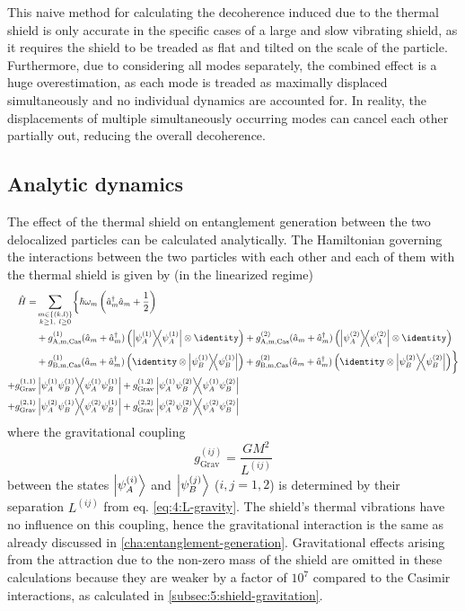 This naive method for calculating the decoherence induced due to the thermal shield is only accurate in the specific cases of a large and slow vibrating shield, as it requires the shield to be treaded as flat and tilted on the scale of the particle.
Furthermore, due to considering all modes separately, the combined effect is a huge overestimation, as each mode is treaded as maximally displaced simultaneously and no individual dynamics are accounted for.
In reality, the displacements of multiple simultaneously occurring modes can cancel each other partially out, reducing the overall decoherence.


\subsection{Analytic dynamics}\label{subsec:5:entanglement-analytical}
The effect of the thermal shield on entanglement generation between the two delocalized particles can be calculated analytically.
The Hamiltonian governing the interactions between the two particles with each other and each of them with the thermal shield is given by (in the linearized regime)
\begin{align}\label{eq:5:hamiltonian}
  \begin{split}
    \op{H} = &\sum_{\substack{m\in\{(k,l)\}\\ k \geq 1,\ l \geq 0}} \biggl\{ \hbar \omega_m \left(\op{a}^\dagger_m \op{a}_m + \frac{1}{2}\right) \\
    &+ g^{(1)}_\mathrm{A,m,Cas}(\op{a}_m + \op{a}^\dagger_m) \left( \ketbra{\psi^{(1)}_A} \otimes \identity \right)
     + g^{(2)}_\mathrm{A,m,Cas}(\op{a}_m + \op{a}^\dagger_m) \left( \ketbra{\psi^{(2)}_A} \otimes \identity \right) \\
    &+ g^{(1)}_\mathrm{B,m,Cas}(\op{a}_m + \op{a}^\dagger_m) \left( \identity \otimes \ketbra{\psi^{(1)}_B} \right)
     + g^{(2)}_\mathrm{B,m,Cas}(\op{a}_m + \op{a}^\dagger_m) \left( \identity \otimes \ketbra{\psi^{(2)}_B} \right)\biggr\} \\
    + g^{(1,1)}_\mathrm{Grav}&\ketbra{\psi^{(1)}_A \psi^{(1)}_B} + g^{(1,2)}_\mathrm{Grav}\ketbra{\psi^{(1)}_A \psi^{(2)}_B} \\
    + g^{(2,1)}_\mathrm{Grav}&\ketbra{\psi^{(2)}_A \psi^{(1)}_B} + g^{(2,2)}_\mathrm{Grav}\ketbra{\psi^{(2)}_A \psi^{(2)}_B}
  \end{split}
\end{align}
where the gravitational coupling
\begin{equation}
  g^{(ij)}_\mathrm{Grav} = \frac{G M^2}{L^{(ij)}}
\end{equation}
between the states $\ket{\psi^{(i)}_A}$ and $\ket{\psi^{(j)}_B}$ ($i,j = 1,2$) is determined by their separation $L^{(ij)}$ from eq. \eqref{eq:4:L-gravity}.
The shield's thermal vibrations have no influence on this coupling, hence the gravitational interaction is the same as already discussed in \cref{cha:entanglement-generation}.
Gravitational effects arising from the attraction due to the non-zero mass of the shield are omitted in these calculations because they are weaker by a factor of $10^7$ compared to the Casimir interactions, as calculated in \cref{subsec:5:shield-gravitation}.

